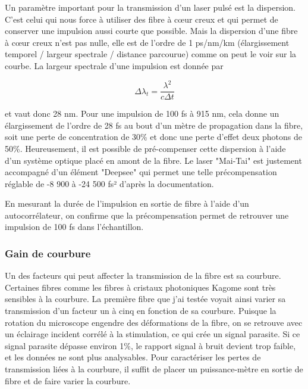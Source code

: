 Un paramètre important pour la transmission d'un laser pulsé est la dispersion. C'est celui qui nous force à utiliser des fibre à cœur creux et qui permet de conserver une impulsion aussi courte que possible. Mais la dispersion d'une fibre à cœur creux n'est pas nulle, elle est de l'ordre de 1 ps/nm/km (élargissement temporel / largeur spectrale / distance parcourue) comme on peut le voir sur la courbe. La largeur spectrale d'une impulsion est donnée par

$$
\Delta \lambda_t = \frac{\lambda^2}{c\Delta t}
$$

et vaut donc 28 nm. Pour une impulsion de 100 fs à 915 nm, cela donne un élargissement de l'ordre de 28 fs au bout d'un mètre de propagation dans la fibre, soit une perte de concentration de 30\% et donc une perte d'effet deux photons de 50\%. Heureusement, il est possible de pré-compenser cette dispersion à l'aide d'un système optique placé en amont de la fibre. Le laser "Mai-Tai" est justement accompagné d'un élément "Deepsee" qui permet une telle précompensation réglable de -8 900 à -24 500 fs² d'après la documentation.


En mesurant la durée de l'impulsion en sortie de fibre à l'aide d'un autocorrélateur, on confirme que la précompensation permet de retrouver une impulsion de 100 fs dans l'échantillon.

\subsubsection{Gain de courbure}



Un des facteurs qui peut affecter la transmission de la fibre est sa courbure. Certaines fibres comme les fibres à cristaux photoniques Kagome sont très sensibles à la courbure. La première fibre que j'ai testée voyait ainsi varier sa transmission d'un facteur un à cinq en fonction de sa courbure. Puisque la rotation du microscope engendre des déformations de la fibre, on se retrouve avec un éclairage incident corrélé à la stimulation, ce qui crée un signal parasite. Si ce signal parasite dépasse environ 1\%, le rapport signal à bruit devient trop faible, et les données ne sont plus analysables. Pour caractériser les pertes de transmission liées à la courbure, il suffit de placer un puissance-mètre en sortie de fibre et de faire varier la courbure.

